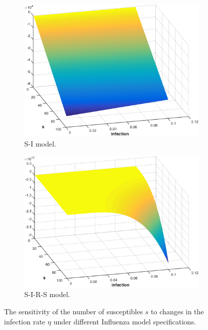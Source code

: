\begin{figure}[t!]
    \centering
    \begin{subfigure}[b]{0.5\textwidth}    
        \centering
        \includegraphics[width=0.8\linewidth, height=0.55\linewidth]{images/sd_infection_sensitivity}
        \caption{S-I model.}
        \label{fig:influenza_sd_sensitivity}
    \end{subfigure}  
    \begin{subfigure}[b]{0.5\textwidth}    
        \centering
        \includegraphics[width=0.8\linewidth, height=0.55\linewidth]{images/sir_infection_sensitivity}
        \caption{S-I-R-S model.}
        \label{fig:influenza_sirs_sensitivity}
    \end{subfigure}  
    \caption{The sensitivity of the number of susceptibles {\footnotesize $s$} to changes in the infection rate {\footnotesize $\eta$} under different Influenza model specifications.}
    \label{fig:influenza_sirs}      
\end{figure}

